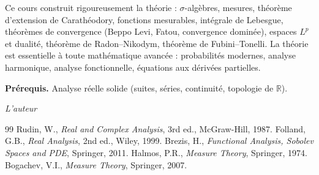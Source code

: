 \documentclass[12pt,a4paper,twoside]{book}
\theoremstyle{definition}
\theoremstyle{plain}
\theoremstyle{remark}
\newcommand{\R}{\mathbb{R}}
\begin{document}
\medskip

Ce cours construit rigoureusement la th\'eorie : $\sigma$-alg\`ebres, mesures, th\'eor\`eme d'extension de Carath\'eodory, fonctions mesurables, int\'egrale de Lebesgue, th\'eor\`emes de convergence (Beppo Levi, Fatou, convergence domin\'ee), espaces $L^p$ et dualit\'e, th\'eor\`eme de Radon--Nikodym, th\'eor\`eme de Fubini--Tonelli. La th\'eorie est essentielle \`a toute math\'ematique avanc\'ee : probabilit\'es modernes, analyse harmonique, analyse fonctionnelle, \'equations aux d\'eriv\'ees partielles.

\medskip

\noindent\textbf{Pr\'erequis.} Analyse r\'eelle solide (suites, s\'eries, continuit\'e, topologie de $\R$).

\vfill
\hfill\textit{L'auteur}


\mainmatter















\backmatter
\begin{thebibliography}{99}
 Rudin, W., \emph{Real and Complex Analysis}, 3rd ed., McGraw-Hill, 1987.
 Folland, G.B., \emph{Real Analysis}, 2nd ed., Wiley, 1999.
 Brezis, H., \emph{Functional Analysis, Sobolev Spaces and PDE}, Springer, 2011.
 Halmos, P.R., \emph{Measure Theory}, Springer, 1974.
 Bogachev, V.I., \emph{Measure Theory}, Springer, 2007.
\end{thebibliography}
\printindex
\end{document}
